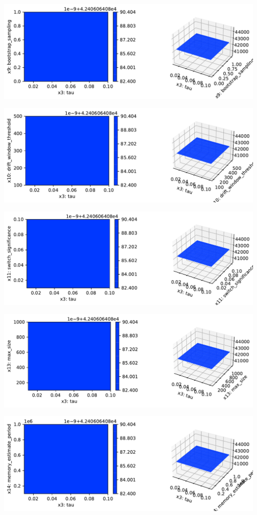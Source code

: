 \documentclass[
  letterpaper,
  DIV=11,
  numbers=noendperiod]{scrreprt}
\begin{document}
\includegraphics{024_spot_hpt_river_friedman_hatr_files/figure-pdf/cell-42-output-45.pdf}

\includegraphics{024_spot_hpt_river_friedman_hatr_files/figure-pdf/cell-42-output-46.pdf}

\includegraphics{024_spot_hpt_river_friedman_hatr_files/figure-pdf/cell-42-output-47.pdf}

\includegraphics{024_spot_hpt_river_friedman_hatr_files/figure-pdf/cell-42-output-48.pdf}

\includegraphics{024_spot_hpt_river_friedman_hatr_files/figure-pdf/cell-42-output-49.pdf}
\end{document}
